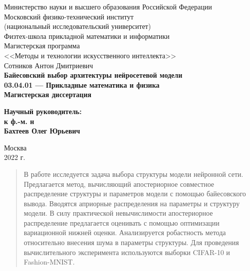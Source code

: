 \documentclass[12pt]{article}
\begin{document}
	
	{
		\renewcommand{\baselinestretch}{1}
		\thispagestyle{empty}
		\begin{center}
			\sc
			Министерство науки и высшего образования Российской Федерации\\
			Московский физико-технический институт\\
			{\rm(национальный исследовательский университет)}\\
			Физтех-школа прикладной математики и информатики\\
			Магистерская программа\\
			<<Методы и технологии искусственного интеллекта>>\\[35mm]
			\rm\large
			Сотников Антон Дмитриевич\\[10mm]
			\bf\Large
			Байесовский выбор архитектуры нейросетевой модели\\[10mm]
			\rm\normalsize
			03.04.01 --- Прикладные математика и физика\\[10mm]
			\sc
			Магистерская диссертация\\[30mm]
		\end{center}
		\hfill\parbox{80mm}{
			\begin{flushleft}
				\bf
				Научный руководитель:\\
				\rm
				к ф.-м. н\\
				Бахтеев Олег Юрьевич\\[5cm]
			\end{flushleft}
		}
		\begin{center}
			Москва\\
			2022 г.
		\end{center}
	}
	
	\newpage
	\tableofcontents
	
	\newpage
	\begin{abstract}
		В работе исследуется задача выбора структуры модели нейронной сети. Предлагается метод, вычисляющий апостериорное совместное распределение структуры и параметров модели с помощью байесовского вывода. Вводятся априорные распределения на параметры и структуру модели. В силу практической невычислимости апостериорное распределение предлагается оценивать с помощью оптимизации вариационной нижней оценки. Анализируется робастность метода относительно внесения шума в параметры структуры. Для проведения вычислительного эксперимента используются выборки CIFAR-10 и Fashion-MNIST.
		
		
	\end{abstract}
	
	\newpage
\end{document}
